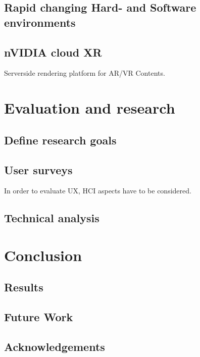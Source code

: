 \documentclass[titlepage, a4paper, 11pt]{scrartcl}
\begin{document}
        \subsection{Rapid changing Hard- and Software environments}
		
		\subsection{nVIDIA cloud XR}
			Serverside rendering platform for AR/VR Contents.

    \section{Evaluation and research}

        \subsection{Define research goals}

        \subsection{User surveys}

            In order to evaluate UX, HCI aspects have to be considered.

        \subsection{Technical analysis}

    \section{Conclusion}

        \subsection{Results}

        \subsection{Future Work}

        \subsection{Acknowledgements}



     
    
\end{document}
